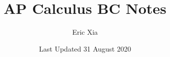\documentclass{article}
\title{AP Calculus BC Notes}
\author{Eric Xia}
\date{Last Updated 31 August 2020}
\begin{document}
    \maketitle
    \tableofcontents
    \pagebreak

    
    
    
    
    
    
    
\end{document}
